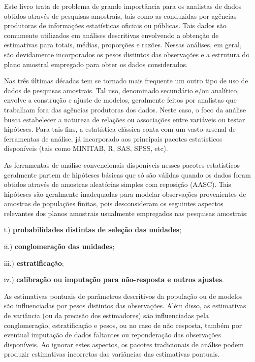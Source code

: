 \documentclass[]{book}
\theoremstyle{definition}
\theoremstyle{definition}
\theoremstyle{definition}
\theoremstyle{remark}
\begin{document}
Este livro trata de problema de grande importância para os analistas de
dados obtidos através de pesquisas amostrais, tais como as conduzidas
por agências produtoras de informações estatísticas oficiais ou
públicas. Tais dados são comumente utilizados em análises descritivas
envolvendo a obtenção de estimativas para totais, médias, proporções e
razões. Nessas análises, em geral, são devidamente incorporados os pesos
distintos das observações e a estrutura do plano amostral empregado para
obter os dados considerados.

Nas três últimas décadas tem se tornado mais frequente um outro tipo de
uso de dados de pesquisas amostrais. Tal uso, denominado secundário e/ou
analítico, envolve a construção e ajuste de modelos, geralmente feitos
por analistas que trabalham fora das agências produtoras dos dados.
Neste caso, o foco da análise busca estabelecer a natureza de relações
ou associações entre variáveis ou testar hipóteses. Para tais fins, a
estatística clássica conta com um vasto arsenal de ferramentas de
análise, já incorporado aos principais pacotes estatísticos disponíveis
(tais como MINITAB, R, SAS, SPSS, etc).

As ferramentas de análise convencionais disponíveis nesses pacotes
estatísticos geralmente partem de hipóteses básicas que só são válidas
quando os dados foram obtidos através de amostras aleatórias simples com
reposição (AASC). Tais hipóteses são geralmente inadequadas para modelar
observações provenientes de amostras de populações finitas, pois
desconsideram os seguintes aspectos relevantes dos planos amostrais
usualmente empregados nas pesquisas amostrais:

i.) \textbf{probabilidades distintas de seleção das unidades};

ii.) \textbf{conglomeração das unidades};

iii.) \textbf{estratificação};

iv.) \textbf{calibração ou imputação para não-resposta e outros
ajustes}.

As estimativas pontuais de parâmetros descritivos da população ou de
modelos são influenciadas por pesos distintos das observações. Além
disso, as estimativas de variância (ou da precisão dos estimadores) são
influenciadas pela conglomeração, estratificação e pesos, ou no caso de
não resposta, também por eventual imputação de dados faltantes ou
reponderação das observações disponíveis. Ao ignorar estes aspectos, os
pacotes tradicionais de análise podem produzir estimativas incorretas
das variâncias das estimativas pontuais.
\end{document}
